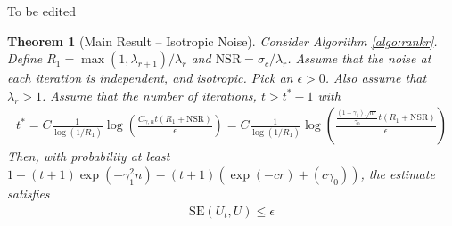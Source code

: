 \documentclass[10pt]{article}
\newtheorem{theorem}{Theorem}
\newcommand{\nsrmax}{\text{NSR}}
\newcommand{\SE}{\mathrm{SE}}
\begin{document}


{\color{blue} To be edited
\begin{theorem}[Main Result -- Isotropic Noise]
Consider Algorithm \ref{algo:rankr}.
Define $R_1 = \max(1, \lambda_{r+1})/\lambda_r$ and $\nsrmax = \sigma_c/\lambda_r$. 
Assume that the noise at each iteration is independent, and isotropic. Pick an $\epsilon > 0$. Also assume that $\lambda_r > 1$.  Assume that the number of iterations, $t > t^* - 1$ with
\begin{align*}
t^* = C \frac{1}{\log(1/R_1)} \log   \left( \frac{C_{\gamma,n} t (R_1 + \nsrmax)}{\epsilon}\right) = C \frac{1}{\log(1/R_1)} \log   \left( \frac{\frac{(1+ \gamma_1)\sqrt{nr}}{\gamma_0} t (R_1 + \nsrmax)}{\epsilon}\right)
\end{align*}
 Then, with probability at least $1 - (t + 1) \exp(- \gamma_1^2 n) - (t+1) (\exp(-cr) + (c\gamma_0))$, the estimate satisfies
 \begin{align*}
 \SE(U_t, U) \leq \epsilon
 \end{align*}
\end{theorem}
}
\end{document}
